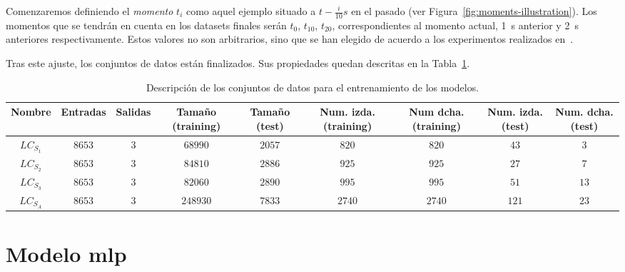 Comenzaremos definiendo el \textit{momento} $t_i$ como aquel ejemplo situado a $t - \frac{i}{10}s$ en el pasado (ver Figura~\ref{fig:moments-illustration}). Los momentos que se tendrán en cuenta en los datasets finales serán $t_0$, $t_10$, $t_20$, correspondientes al momento actual, \SI{1}{\second} anterior y \SI{2}{\second} anteriores respectivamente. Estos valores no son arbitrarios, sino que se han elegido de acuerdo a los experimentos realizados en~\cite{EL PAPER CUANDO NOS LO PUBLIQUEN}.

Tras este ajuste, los conjuntos de datos están finalizados. Sus propiedades quedan descritas en la Tabla~\ref{tbl:lc-datasets-description}.

\begin{table}[!b]
	\caption[Descripción de los conjuntos de datos]{Descripción de los conjuntos de datos para el entrenamiento de los modelos.}
	\label{tbl:lc-datasets-description}
	\begin{tabular}{ccccccccc}
		\toprule
		Nombre & Entradas & Salidas & Tamaño (training) & Tamaño (test) & Num. izda. (training) & Num dcha. (training) & Num. izda. (test) & Num. dcha. (test) \\
		\midrule
		$LC_{S_1}$ & $8653$ & $3$ & $68990$  & $2057$ & $820$ & $820$  & $43$  & $3$   \\
		$LC_{S_2}$ & $8653$ & $3$ & $84810$  & $2886$ & $925$ & $925$  & $27$  & $7$   \\
		$LC_{S_3}$ & $8653$ & $3$ & $82060$  & $2890$ & $995$ & $995$  & $51$  & $13$  \\
		$LC_{S_A}$ & $8653$ & $3$ & $248930$ & $7833$ & $2740$ & $2740$ & $121$ & $23$ \\
		\bottomrule
	\end{tabular}
\end{table}

\section{Modelo \ac{mlp}}

